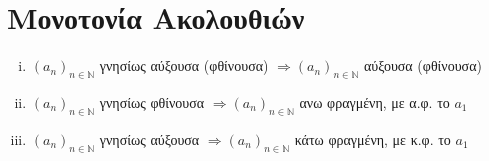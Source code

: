 \documentclass[main.tex]{subfiles}
\begin{document}
\section{Μονοτονία Ακολουθιών}


\begin{rems}
\item {}
    \begin{enumerate}[i)]
        \item $ (a_{n})_{n \in \mathbb{N}} $ γνησίως αύξουσα (φθίνουσα) $ 
            \Rightarrow (a_{n})_{n \in \mathbb{N}} $ αύξουσα (φθίνουσα) 
        \item $ (a_{n})_{n \in \mathbb{N}} $ γνησίως φθίνουσα  $ 
            \Rightarrow (a_{n})_{n \in \mathbb{N}} $ ανω φραγμένη, με 
            α.φ. το $ a_{1} $  
        \item $ (a_{n})_{n \in \mathbb{N}} $ γνησίως αύξουσα  $ 
            \Rightarrow (a_{n})_{n \in \mathbb{N}} $ κάτω φραγμένη, με 
            κ.φ. το $ a_{1} $  
    \end{enumerate}
\end{rems}
\end{document}
